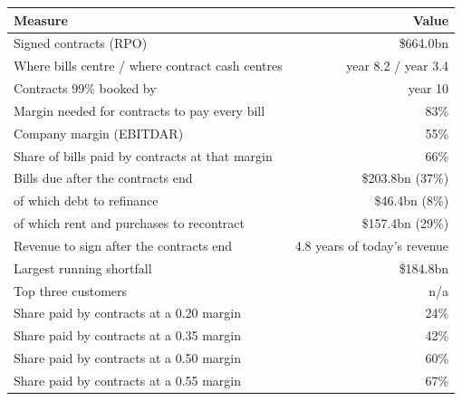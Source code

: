 \documentclass[11pt,a4paper]{article}
\begin{document}
\begin{center}\footnotesize\setlength{\tabcolsep}{3.5pt}\begin{tabular}{@{}lr@{}}\toprule
Measure & Value \\\midrule
Signed contracts (RPO) & \$664.0bn \\
Where bills centre / where contract cash centres & year 8.2 / year 3.4 \\
Contracts 99\% booked by & year 10 \\
Margin needed for contracts to pay every bill & 83\% \\
Company margin (EBITDAR) & 55\% \\
Share of bills paid by contracts at that margin & 66\% \\
Bills due after the contracts end & \$203.8bn (37\%) \\
\quad of which debt to refinance & \$46.4bn (8\%) \\
\quad of which rent and purchases to recontract & \$157.4bn (29\%) \\
Revenue to sign after the contracts end & 4.8 years of today's revenue \\
Largest running shortfall & \$184.8bn \\
Top three customers & n/a \\
Share paid by contracts at a 0.20 margin & 24\% \\
Share paid by contracts at a 0.35 margin & 42\% \\
Share paid by contracts at a 0.50 margin & 60\% \\
Share paid by contracts at a 0.55 margin & 67\% \\
\bottomrule\end{tabular}\end{center}
\end{document}
